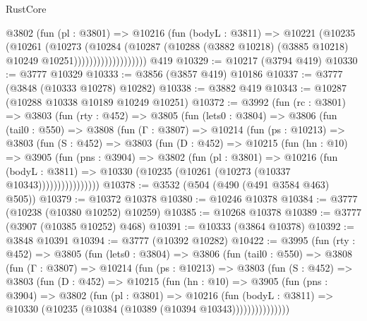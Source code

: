 \begin{lexlean}{RustCore}
\begin{coremodule}
                        @3802
                          (fun (pl : @3801) =>
                          @10216
                            (fun (bodyL : @3811) =>
                            @10221
                              (@10235
                                (@10261
                                  (@10273
                                    (@10284
                                      (@10287
                                        (@10288
                                          (@3882 @10218)
                                          (@3885 @10218)
                                          @10249
                                          @10251)))))))))))))))))))
    @419
@10329 := @10217 (@3794 @419)
@10330 := @3777 @10329
@10333 := @3856 (@3857 @419) @10186
@10337 := @3777 (@3848 (@10333 @10278) @10282)
@10338 := @3882 @419
@10343 := @10287 (@10288 @10338 @10189 @10249 @10251)
@10372 := @3992
    (fun (rc : @3801) =>
    @3803
      (fun (rty : @452) =>
      @3805
        (fun (lets0 : @3804) =>
        @3806
          (fun (tail0 : @550) =>
          @3808
            (fun (Γ : @3807) =>
            @10214
              (fun (ps : @10213) =>
              @3803
                (fun (S : @452) =>
                @3803
                  (fun (D : @452) =>
                  @10215
                    (fun (hn : @10) =>
                    @3905
                      (fun (pns : @3904) =>
                      @3802
                        (fun (pl : @3801) =>
                        @10216
                          (fun (bodyL : @3811) =>
                          @10330 (@10235 (@10261 (@10273 (@10337 @10343))))))))))))))))
@10378 := @3532 (@504 (@490 (@491 @3584 @463) @505))
@10379 := @10372 @10378
@10380 := @10246 @10378
@10384 := @3777 (@10238 (@10380 @10252) @10259)
@10385 := @10268 @10378
@10389 := @3777 (@3907 (@10385 @10252) @468)
@10391 := @10333 (@3864 @10378)
@10392 := @3848 @10391
@10394 := @3777 (@10392 @10282)
@10422 := @3995
    (fun (rty : @452) =>
    @3805
      (fun (lets0 : @3804) =>
      @3806
        (fun (tail0 : @550) =>
        @3808
          (fun (Γ : @3807) =>
          @10214
            (fun (ps : @10213) =>
            @3803
              (fun (S : @452) =>
              @3803
                (fun (D : @452) =>
                @10215
                  (fun (hn : @10) =>
                  @3905
                    (fun (pns : @3904) =>
                    @3802
                      (fun (pl : @3801) =>
                      @10216
                        (fun (bodyL : @3811) =>
                        @10330 (@10235 (@10384 (@10389 (@10394 @10343)))))))))))))))

\end{coremodule}
\end{lexlean}
